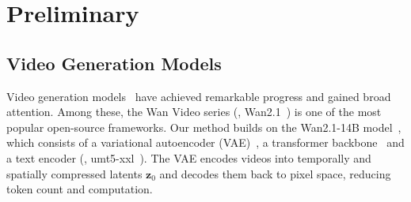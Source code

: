 \section{Preliminary}
\label{saber:sec:preliminary}

\subsection{Video Generation Models}
\label{saber:sec:video_model}
Video generation models~\citep{hong2022cogvideo, yang2024cogvideox, kong2024hunyuanvideo, hacohen2024ltx, wan2025wan} have achieved remarkable progress and gained broad attention.
Among these, the Wan Video series (\eg, Wan2.1~\citep{wan2025wan}) is one of the most popular open-source frameworks.
Our method builds on the Wan2.1-14B model~\citep{wan2025wan}, which consists of a variational autoencoder (VAE)~\citep{kingma2013auto}, a transformer backbone~\citep{vaswani2017attention, peebles2023scalable} and a text encoder (\ie, umt5-xxl~\citep{chung2023unimax}).
%
The VAE encodes videos into temporally and spatially compressed latents ${\mathbf{z}_{0}}$ and decodes them back to pixel space, reducing token count and computation.
%
